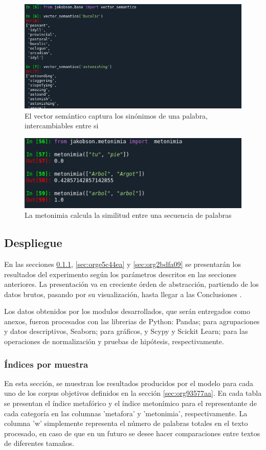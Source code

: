 \documentclass[12pt,letterpaper,twoside]{article}
\begin{document}
\begin{figure}[H]
\centering
\includegraphics[width=.8\linewidth]{./assets/codigo_vector_semantico.png}
\caption{\label{fig:cod_vector_semantico}El vector semántico captura los sinónimos de una palabra, intercambiables entre si}
\end{figure}

\begin{figure}[H]
\centering
\includegraphics[width=.8\linewidth]{./assets/codigo_metonimia.png}
\caption{\label{fig:cod_metonimia}La metonimia calcula la similitud entre una secuencia de palabras}
\end{figure}



\subsection{Despliegue}
\label{sec:orgdee4c0f}
En las secciones \ref{sec:org08f67c1}, \ref{sec:orge5c44ea} y
\ref{sec:org2bdfa09} se presentarán los resultados del experimento
según los parámetros descritos en las secciones anteriores.
La presentación va en creciente órden de abstracción, partiendo
de los datos brutos, pasando por su visualización, hasta llegar
a las Conclusiones .

Los datos obtenidos por los modulos desarrollados, que serán
entregados como anexos, fueron procesados con las librerias de Python: Pandas;
para agrupaciones y datos descriptivos, Seaborn; para gráficos, y
Scypy y Scickit Learn; para las operaciones de normalización y pruebas
de hipótesis, respectivamente.

\subsubsection{Índices por muestra}
\label{sec:org08f67c1}
En esta sección, se muestran los resultados producidos por el modelo
para cada uno de los corpus objetivos definidos en la sección
\ref{sec:org93577aa}. En cada tabla se presentan el índice
metafórico y el índice metonímico para el representante de cada
categoría en las columnas 'metafora' y 'metonimia',
respectivamente. La columna 'w' simplemente representa el número de
palabras totales en el texto procesado, en caso de que en un futuro se
desee hacer comparaciones entre textos de diferentes tamaños.
\end{document}
